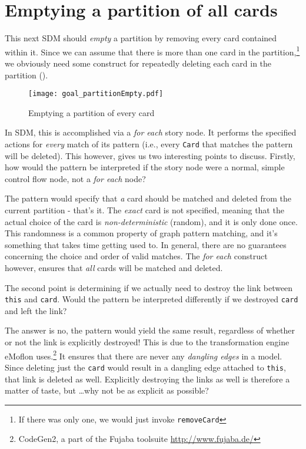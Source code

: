 \newpage
\hypertarget{sec:emptyPartition}{}
\section{Emptying a partition of all cards}
\genHeader

This next SDM should \emph{empty} a partition by removing every card contained within it. Since we can assume that there is more than one card in the
partition,\footnote{If there was only one, we would just invoke \texttt{removeCard}} we obviously need some construct for repeatedly deleting each card in the
partition (). 

\begin{figure}[htbp]
	\centering
  \texttt{[image: goal\_partitionEmpty.pdf]}
	\caption{Emptying a partition of every card}
	\label{fig:goal_empty}
\end{figure}
\FloatBarrier

In SDM, this  is accomplished via a \emph{for each} story node. It performs the specified actions for \emph{every} match of its
pattern (i.e., every \texttt{Card} that matches the pattern will be deleted). This however, gives us two interesting points to discuss.
Firstly, how would the pattern be interpreted if the story node were a normal, simple control flow node, not a \emph{for each} node?

The pattern would specify that \emph{a} card should be matched and deleted from the current partition - that's it. The \emph{exact} card is not specified,
meaning that the actual choice of the card is \emph{non-deterministic} (random), and it is only done once. This randomness is a common property of graph pattern
matching, and it's something that takes time getting used to.  In general, there are no guarantees concerning the choice and order of valid matches. The
\emph{for each} construct however, ensures that \emph{all} cards will be matched and deleted.

The second point is determining if we actually need to destroy the link between \texttt{this} and \texttt{card}. Would the pattern be interpreted differently if
 we destroyed \texttt{card} and left the link?

The answer is no, the pattern would yield the same result, regardless of whether or not the link is explicitly destroyed! This is due to
the transformation engine eMoflon uses.\footnote{CodeGen2, a part of the Fujaba toolsuite \url{http://www.fujaba.de/}} It ensures that
there are never any \emph{dangling edges} in a model. Since deleting just the \texttt{card} would result in a dangling edge attached to \texttt{this}, that
link is deleted as well. Explicitly destroying the links as well is therefore a matter of taste, but \ldots why not be as explicit as possible?


